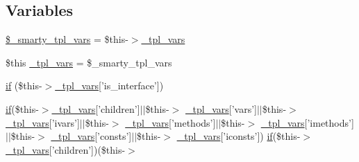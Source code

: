 \subsection*{\-Variables}
\begin{DoxyCompactItemize}
\item 
\hyperlink{default_234d6fa4bfd5eef6424a9ddc74a166350_2_06_06165_05_06_061653142046_05class_8tpl_8php_a14dde6d029d65a879ee7bc1ebc398dd1}{\$\-\_\-smarty\-\_\-tpl\-\_\-vars} = \$this-\/$>$\hyperlink{_06_06127_05_06_0612781687_05pkgelementindex_8tpl_8php_a4a4846d8e68d455590131a05697f67a3}{\-\_\-tpl\-\_\-vars}
\item 
\$this \hyperlink{default_234d6fa4bfd5eef6424a9ddc74a166350_2_06_06165_05_06_061653142046_05class_8tpl_8php_a4a4846d8e68d455590131a05697f67a3}{\-\_\-tpl\-\_\-vars} = \$\-\_\-smarty\-\_\-tpl\-\_\-vars
\item 
\hyperlink{default_234d6fa4bfd5eef6424a9ddc74a166350_2_06_06165_05_06_061653142046_05class_8tpl_8php_a0c616e7915362f321d6e093106e11910}{if} (\$this-\/$>$\hyperlink{_06_06127_05_06_0612781687_05pkgelementindex_8tpl_8php_a4a4846d8e68d455590131a05697f67a3}{\-\_\-tpl\-\_\-vars}\mbox{[}'is\-\_\-interface'\mbox{]})
\item 
\hyperlink{_setup_8inc_8php_ad0184337b31d13763ec8751feff4aabe}{if}(\$this-\/$>$\hyperlink{_06_06127_05_06_0612781687_05pkgelementindex_8tpl_8php_a4a4846d8e68d455590131a05697f67a3}{\-\_\-tpl\-\_\-vars}\mbox{[}'children'\mbox{]}$|$$|$\$this-\/$>$\*
\hyperlink{_06_06127_05_06_0612781687_05pkgelementindex_8tpl_8php_a4a4846d8e68d455590131a05697f67a3}{\-\_\-tpl\-\_\-vars}\mbox{[}'vars'\mbox{]}$|$$|$\$this-\/$>$\*
\hyperlink{_06_06127_05_06_0612781687_05pkgelementindex_8tpl_8php_a4a4846d8e68d455590131a05697f67a3}{\-\_\-tpl\-\_\-vars}\mbox{[}'ivars'\mbox{]}$|$$|$\$this-\/$>$\*
\hyperlink{_06_06127_05_06_0612781687_05pkgelementindex_8tpl_8php_a4a4846d8e68d455590131a05697f67a3}{\-\_\-tpl\-\_\-vars}\mbox{[}'methods'\mbox{]}$|$$|$\$this-\/$>$\*
\hyperlink{_06_06127_05_06_0612781687_05pkgelementindex_8tpl_8php_a4a4846d8e68d455590131a05697f67a3}{\-\_\-tpl\-\_\-vars}\mbox{[}'imethods'\mbox{]}$|$$|$\$this-\/$>$\*
\hyperlink{_06_06127_05_06_0612781687_05pkgelementindex_8tpl_8php_a4a4846d8e68d455590131a05697f67a3}{\-\_\-tpl\-\_\-vars}\mbox{[}'consts'\mbox{]}$|$$|$\$this-\/$>$\*
\hyperlink{_06_06127_05_06_0612781687_05pkgelementindex_8tpl_8php_a4a4846d8e68d455590131a05697f67a3}{\-\_\-tpl\-\_\-vars}\mbox{[}'iconsts'\mbox{]}) \hyperlink{_setup_8inc_8php_ad0184337b31d13763ec8751feff4aabe}{if}(\$this-\/$>$\*
\hyperlink{_06_06127_05_06_0612781687_05pkgelementindex_8tpl_8php_a4a4846d8e68d455590131a05697f67a3}{\-\_\-tpl\-\_\-vars}\mbox{[}'children'\mbox{]})(\$this-\/$>$\*

\end{DoxyCompactItemize}
